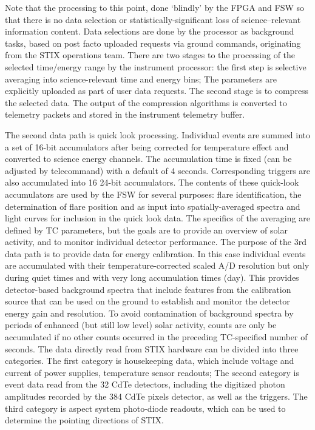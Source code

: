 \documentclass{aa}
\begin{document}
Note that the processing to this point, done ‘blindly’ by the FPGA and FSW so that there is no data selection or statistically-significant loss of science–relevant information content. Data selections are done by the processor as  background tasks, based on  post facto uploaded requests via ground commands, originating from the STIX operations team.
There are two stages to the processing of the selected time/energy range by the instrument processor: the first step is selective averaging into science-relevant time and energy bins; The parameters are explicitly uploaded as part of user data requests.  The second stage is to  compress the selected data. The output of the compression algorithms is converted to telemetry packets and stored in the instrument telemetry buffer. 

The second data path is quick look processing.  Individual events are summed into a set of 16-bit accumulators after being corrected for temperature effect and converted to science energy channels. 
The accumulation time is fixed (can be adjusted by telecommand) with a default of 4 seconds. 
Corresponding triggers are also accumulated into 16 24-bit accumulators. The contents of these quick-look accumulators are used by the FSW for several purposes: flare identification, the determination of flare position and as input into spatially-averaged spectra and light curves for inclusion in the quick look data. The specifics of the averaging are defined by TC parameters, but the goals are to provide an overview of solar activity, and to monitor individual detector performance.
The purpose of the 3rd data path is to provide data for energy calibration. In this case individual events are accumulated with their temperature-corrected scaled A/D resolution but only during quiet times and with very long accumulation times (day). This provides detector-based
background spectra that include features from the calibration source that can be used on the
ground to establish and monitor the detector energy gain and resolution. To avoid
contamination of background spectra by periods of enhanced (but still low level) solar activity,
counts are only be accumulated if no other counts occurred in the preceding TC-specified
number of seconds.
The data directly read from STIX hardware can be divided into three categories. The first category is housekeeping data, which include voltage and current of power supplies, temperature sensor readouts; The second category is event data read from the 32 CdTe detectors, including the digitized photon amplitudes recorded by the 384 CdTe pixels detector, as well as the triggers. The third category is aspect system photo-diode readouts, which can be used to determine the pointing directions of STIX. 
\end{document}
